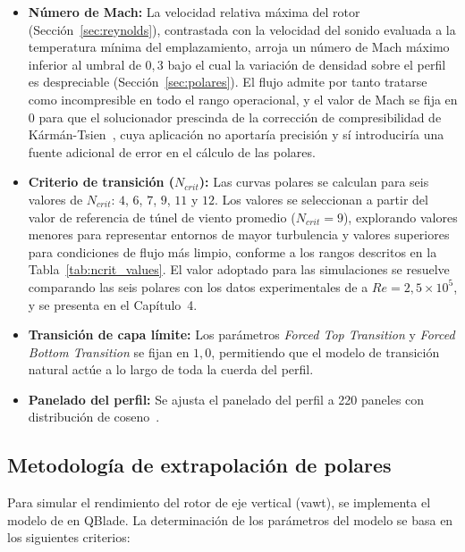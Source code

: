 \begin{itemize}
    \item \textbf{Número de Mach:} La velocidad relativa máxima del rotor (Sección~\ref{sec:reynolds}), contrastada con la velocidad del sonido evaluada a la temperatura mínima del emplazamiento, arroja un número de Mach máximo inferior al umbral de $0{,}3$ bajo el cual la variación de densidad sobre el perfil es despreciable (Sección~\ref{sec:polares}). El flujo admite por tanto tratarse como incompresible en todo el rango operacional, y el valor de Mach se fija en $0$ para que el solucionador prescinda de la corrección de compresibilidad de Kármán-Tsien~\parencite{Karman1941,Tsien1939}, cuya aplicación no aportaría precisión y sí introduciría una fuente adicional de error en el cálculo de las polares.

    \item \textbf{Criterio de transición ($N_{crit}$):} Las curvas polares se calculan para seis valores de $N_{crit}$: $4$, $6$, $7$, $9$, $11$ y $12$. Los valores se seleccionan a partir del valor de referencia de túnel de viento promedio ($N_{crit}=9$), explorando valores menores para representar entornos de mayor turbulencia y valores superiores para condiciones de flujo más limpio, conforme a los rangos descritos en la Tabla~\ref{tab:ncrit_values}. El valor adoptado para las simulaciones se resuelve comparando las seis polares con los datos experimentales de \textcite{Bianchini2015} a $Re = 2{,}5 \times 10^5$, y se presenta en el Capítulo~4.
    
    \item \textbf{Transición de capa límite:} Los parámetros \textit{Forced Top Transition} y \textit{Forced Bottom Transition} se fijan en $1{,}0$, permitiendo que el modelo de transición natural actúe a lo largo de toda la cuerda del perfil.

    \item \textbf{Panelado del perfil:} Se ajusta el panelado del perfil a 220 paneles con distribución de coseno~\parencite{drela1989xfoil}.
\end{itemize}

\subsection{Metodología de extrapolación de polares}
\label{sec:extrapolacion_polares}

Para simular el rendimiento del rotor de eje vertical (\gls{vawt}), se implementa el modelo de \textcite{montgomerie2004methods} en QBlade. La determinación de los parámetros del modelo se basa en los siguientes criterios:

